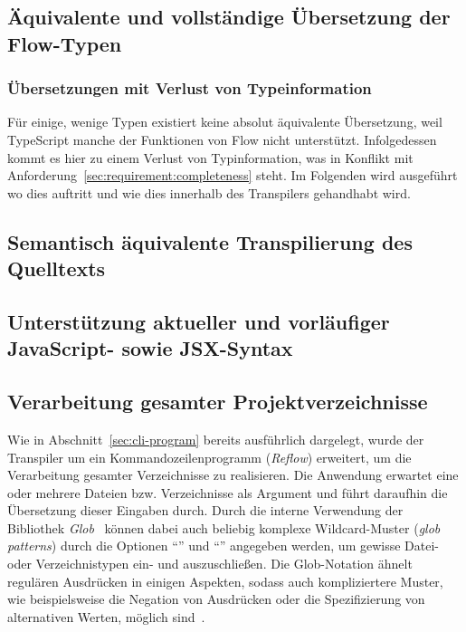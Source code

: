 \subsection{Äquivalente und vollständige Übersetzung der Flow-Typen}


\subsubsection{Übersetzungen mit Verlust von Typeinformation}
\label{sec:lossy-translations}

Für einige, wenige Typen existiert keine absolut äquivalente Übersetzung, weil TypeScript manche der Funktionen von Flow nicht unterstützt. Infolgedessen kommt es hier zu einem Verlust von Typinformation, was in Konflikt mit Anforderung~\ref{sec:requirement:completeness} steht. Im Folgenden wird ausgeführt wo dies auftritt und wie dies innerhalb des Transpilers gehandhabt wird.

\subsection{Semantisch äquivalente Transpilierung des Quelltexts}


\subsection{Unterstützung aktueller und vorläufiger JavaScript- sowie JSX-Syntax}


\subsection{Verarbeitung gesamter Projektverzeichnisse}

Wie in Abschnitt~\ref{sec:cli-program} bereits ausführlich dargelegt, wurde der Transpiler um ein Kommandozeilenprogramm (\textit{Reflow}) erweitert, um die Verarbeitung gesamter Verzeichnisse zu realisieren. Die Anwendung erwartet eine oder mehrere Dateien bzw. Verzeichnisse als Argument und führt daraufhin die Übersetzung dieser Eingaben durch.
Durch die interne Verwendung der Bibliothek \textit{Glob}~\autocite{NPM:GLOB} können dabei auch beliebig komplexe Wildcard-Muster (\textit{glob patterns}) durch die Optionen \enquote{} und \enquote{} angegeben werden, um gewisse Datei- oder Verzeichnistypen ein- und auszuschließen. Die Glob-Notation ähnelt regulären Ausdrücken in einigen Aspekten, sodass auch kompliziertere Muster, wie beispielsweise die Negation von Ausdrücken oder die Spezifizierung von alternativen Werten, möglich sind~\autocite{MAN:GLOB}.

